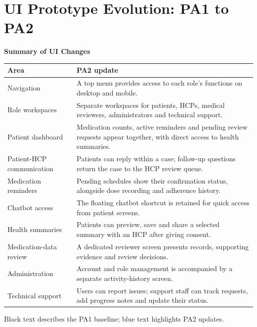 \clearpage
\section{UI Prototype Evolution: PA1 to PA2}
\label{sec:ui-prototype-evolution}

\noindent\textbf{Summary of UI Changes}

\begin{tabularx}{\textwidth}{|L{3.4cm}|Y|}
\hline
\textbf{Area} & \textbf{PA2 update}\\ \hline
Navigation & \textcolor{instructionblue}{A top menu provides access to each role's functions on desktop and mobile.}\\ \hline
Role workspaces & \textcolor{instructionblue}{Separate workspaces for patients, HCPs, medical reviewers, administrators and technical support.}\\ \hline
Patient dashboard & \textcolor{instructionblue}{Medication counts, active reminders and pending review requests appear together, with direct access to health summaries.}\\ \hline
Patient-HCP communication & \textcolor{instructionblue}{Patients can reply within a case; follow-up questions return the case to the HCP review queue.}\\ \hline
Medication reminders & \textcolor{instructionblue}{Pending schedules show their confirmation status, alongside dose recording and adherence history.}\\ \hline
Chatbot access & \textcolor{instructionblue}{The floating chatbot shortcut is retained for quick access from patient screens.}\\ \hline
Health summaries & \textcolor{instructionblue}{Patients can preview, save and share a selected summary with an HCP after giving consent.}\\ \hline
Medication-data review & \textcolor{instructionblue}{A dedicated reviewer screen presents records, supporting evidence and review decisions.}\\ \hline
Administration & \textcolor{instructionblue}{Account and role management is accompanied by a separate activity-history screen.}\\ \hline
Technical support & \textcolor{instructionblue}{Users can report issues; support staff can track requests, add progress notes and update their status.}\\ \hline
\end{tabularx}

\smallskip
{\small Black text describes the PA1 baseline; \textcolor{instructionblue}{blue text highlights PA2 updates}.}

